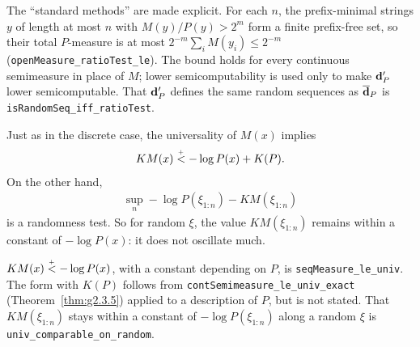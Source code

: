 \begin{formalization}
The ``standard methods'' are made explicit. For each \( n \), the prefix-minimal strings
\( y \) of length at most \( n \) with \( M(y)/P(y) > 2^{m} \) form a finite prefix-free set,
so their total \( P \)-measure is at most \( 2^{-m} \sum_{i} M(y_{i}) \le 2^{-m} \)
(\texttt{openMeasure\_ratioTest\_le}). The bound holds for every continuous semimeasure in
place of \( M \); lower semicomputability is used only to make \( \mathbf{d}'_{P} \) lower
semicomputable. That \( \mathbf{d}'_{P} \) defines the same random sequences as \( \overline{\mathbf{d}}_{P} \) is
\texttt{isRandomSeq\_iff\_ratioTest}.
\end{formalization}

Just as in the discrete case, the universality of \( M(x) \) implies
 \begin{align*}
   KM(x) \stackrel{{}_+}{<} -\log P(x) +K(P).
 \end{align*}
      On the other hand,
 \begin{align*}
   \sup_{n} -\log P(\xi_{1:n})-KM(\xi_{1:n})
 \end{align*}
is a randomness test.
So for random \( \xi \), the value \( KM(\xi_{1:n}) \) remains within a constant of
\( -\log P(x) \): it does not oscillate much.

\begin{formalization}
\( KM(x) \stackrel{{}_+}{<} -\log P(x) \), with a constant depending on \( P \), is
\texttt{seqMeasure\_le\_univ}. The form with \( K(P) \) follows from
\texttt{contSemimeasure\_le\_univ\_exact} (Theorem~\ref{thm:g2.3.5}) applied to a description
of \( P \), but is not stated. That \( KM(\xi_{1:n}) \) stays within a constant of
\( -\log P(\xi_{1:n}) \) along a random \( \xi \) is \texttt{univ\_comparable\_on\_random}.
\end{formalization}
